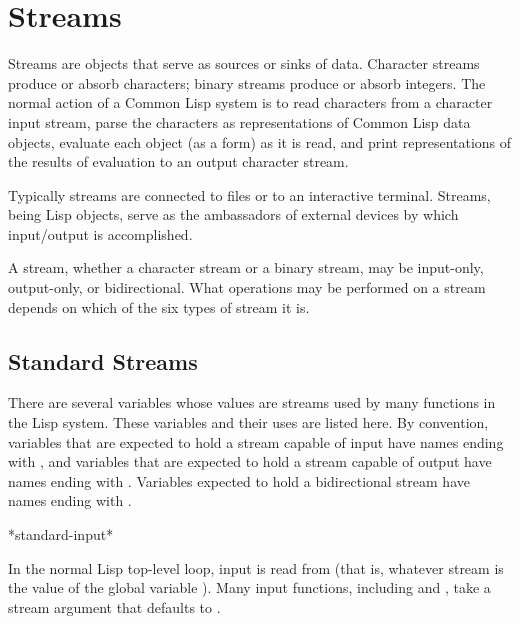 
\clearpage\def\pagestatus{FINAL PROOF}

\ifx \rulang\Undef

\chapter{Streams}
\label{STREAM}

Streams are objects that serve as sources or sinks of data.
Character streams produce or absorb characters;
binary streams produce or absorb integers.
The normal action of a Common Lisp system is to read characters from
a character input stream, parse the characters as representations
of Common Lisp data objects, evaluate each object (as a form) as it is read, and
print representations of the results of
evaluation to an output character stream.

Typically streams are connected to files or to an interactive terminal.
Streams, being Lisp objects, serve as the ambassadors of external
devices by which input/output is accomplished.

A stream, whether a character stream or a binary
stream, may be input-only, output-only, or bidirectional.
What operations may be performed on a stream depends on which of
the six types of stream it is.

\section {Standard Streams}

There are several variables whose values are streams used by many
functions in the Lisp system.  These variables and their uses are
listed here.  By convention, variables that are expected to hold a
stream capable of input have names ending with , and
variables that are expected to hold a
stream capable of output have names ending with .
Variables expected to hold a
bidirectional stream have names ending with .

\begin{defun}[Variable]
*standard-input*

In the normal Lisp top-level loop, input is read from
 (that is, whatever stream is the value of the global
variable ).  Many input functions, including
 and , take a stream argument that defaults to
.
\end{defun}

